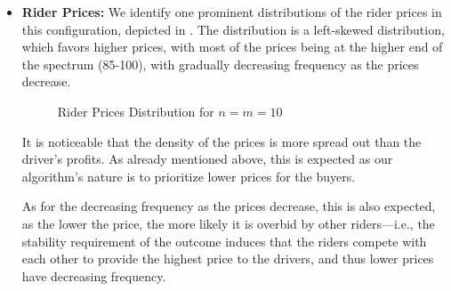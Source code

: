 \documentclass{article}
\begin{document}
\begin{enumerate}[label=(\alph*)]
\begin{itemize}
        \begin{figure}[H]
            \centering
            \resizebox{0.5\textwidth}{!}{}
            \caption{Driver Profits Distribution for $n = m = 10$}
            \label{fig:q10b_n=10_m=10_dp}
        \end{figure}
        
        The former is expected due to our algorithm from Question 9, which encodes the exchange network as a matching market context where the riders being the buyers and the drivers being the sellers. As the stable outcome is calculated by the market equilibrium algorithm which prioritizes lower prices for the buyers, the profits are thus lower. 
        
        The latter is also expected as the higher profits are, the more likely they are undercut by the other drivers---i.e., the drivers are competing with each other to provide the lowest price to the riders, and thus higher profits have decreasing frequency.

        \item \textbf{Rider Prices:} We identify one prominent distributions of the rider prices in this configuration, depicted in . The distribution is a left-skewed distribution, which favors higher prices, with most of the prices being at the higher end of the spectrum (85-100), with gradually decreasing frequency as the prices decrease.
        
        \begin{figure}[H]
            \centering
            \resizebox{0.5\textwidth}{!}{}
            \caption{Rider Prices Distribution for $n = m = 10$}
            \label{fig:q10b_n=10_m=10_rp}
        \end{figure}

        It is noticeable that the density of the prices is more spread out than the driver's profits. As already mentioned above, this is expected as our algorithm's nature is to prioritize lower prices for the buyers.

        As for the decreasing frequency as the prices decrease, this is also expected, as the lower the price, the more likely it is overbid by other riders---i.e., the stability requirement of the outcome induces that the riders compete with each other to provide the highest price to the drivers, and thus lower prices have decreasing frequency.


\end{itemize}
\end{enumerate}
\end{document}
